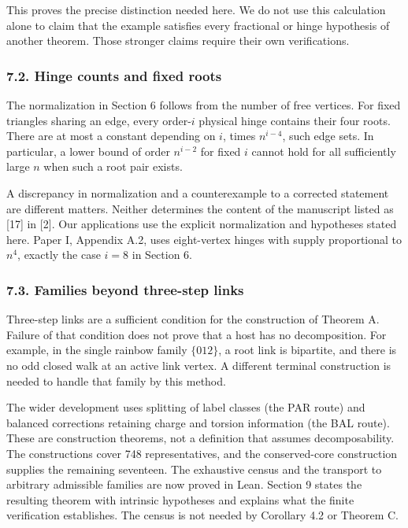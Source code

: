 \documentclass[english,11pt,a4paper]{article}
\begin{document}
This proves the precise distinction needed here. We do not use this calculation alone to claim that the example satisfies every fractional or hinge hypothesis of another theorem. Those stronger claims require their own verifications.

\subsubsection{7.2. Hinge counts and fixed roots}\label{hinge-counts-and-fixed-roots}

The normalization in Section 6 follows from the number of free vertices. For fixed triangles sharing an edge, every order-\(i\) physical hinge contains their four roots. There are at most a constant depending on \(i\), times \(n^{i-4}\), such edge sets. In particular, a lower bound of order \(n^{i-2}\) for fixed \(i\) cannot hold for all sufficiently large \(n\) when such a root pair exists.

A discrepancy in normalization and a counterexample to a corrected statement are different matters. Neither determines the content of the manuscript listed as {[}17{]} in {[}2{]}. Our applications use the explicit normalization and hypotheses stated here. Paper I, Appendix A.2, uses eight-vertex hinges with supply proportional to \(n^4\), exactly the case \(i=8\) in Section 6.

\subsubsection{7.3. Families beyond three-step links}\label{families-beyond-three-step-links}

Three-step links are a sufficient condition for the construction of Theorem A. Failure of that condition does not prove that a host has no decomposition. For example, in the single rainbow family \(\{012\}\), a root link is bipartite, and there is no odd closed walk at an active link vertex. A different terminal construction is needed to handle that family by this method.

The wider development uses splitting of label classes (the PAR route) and balanced corrections retaining charge and torsion information (the BAL route). These are construction theorems, not a definition that assumes decomposability. The constructions cover 748 representatives, and the conserved-core construction supplies the remaining seventeen. The exhaustive census and the transport to arbitrary admissible families are now proved in Lean. Section 9 states the resulting theorem with intrinsic hypotheses and explains what the finite verification establishes. The census is not needed by Corollary 4.2 or Theorem C.
\end{document}
